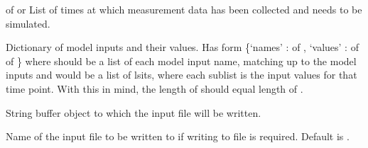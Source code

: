 \documentclass[letterpaper,10pt,english]{sphinxmanual}
\begin{document}
\begin{fulllineitems}
\begin{quote}
\begin{description}
\begin{itemize}
\end{itemize}

\end{description}\end{quote}

\begin{fulllineitems}
\label{\detokenize{bcmdModel:bayescmd.bcmdModel.input_creation.InputCreator.times}}
 of  or  \textendash{} List of times at which measurement data has been collected and needs
to be simulated.

\end{fulllineitems}


\begin{fulllineitems}
\label{\detokenize{bcmdModel:bayescmd.bcmdModel.input_creation.InputCreator.inputs}}
 \textendash{} Dictionary of model inputs and their values. Has form
\{‘names’ :  of ,
‘values’ :  of  of \}
where  should be a list of each model input name, matching up to
the model inputs and  would be a list of lsits, where each
sublist is the input values for that time point. With this in mind,
the length of  should equal length of .

\end{fulllineitems}


\begin{fulllineitems}
\label{\detokenize{bcmdModel:bayescmd.bcmdModel.input_creation.InputCreator.f_out}}
 \textendash{} String buffer object to which the input file will be written.

\end{fulllineitems}


\begin{fulllineitems}
\label{\detokenize{bcmdModel:bayescmd.bcmdModel.input_creation.InputCreator.filename}}
 \textendash{} Name of the input file to be written to if writing to file is required.
Default is .


\end{fulllineitems}
\end{fulllineitems}
\end{document}

